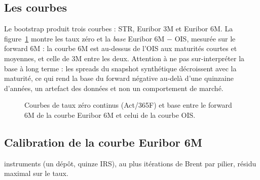 \documentclass[11pt,a4paper]{article}
\newcommand{\estr}{\texorpdfstring{\texteuro STR}{EUR STR}}
\theoremstyle{plain}
\theoremstyle{definition}
\theoremstyle{remark}
\begin{document}
\subsection{Les courbes}
Le bootstrap produit trois courbes : \estr{}, Euribor 3M et Euribor 6M. La
figure~\ref{fig:curves} montre les taux zéro et la \emph{base} Euribor 6M $-$ OIS, mesurée sur le
forward 6M : la courbe 6M est au-dessus de l'OIS aux maturités courtes et moyennes, et celle de 3M entre
les deux. Attention à ne pas sur-interpréter la base à long terme : les spreads du snapshot synthétique
décroissent avec la maturité, ce qui rend la base du forward négative au-delà d'une quinzaine d'années,
un artefact des données et non un comportement de marché.
\begin{figure}[H]
\centering
{}
\caption{Courbes de taux zéro continus (Act/365F) et base entre le forward 6M de la courbe Euribor 6M
et celui de la courbe OIS.}\label{fig:curves}
\end{figure}

\subsection{Calibration de la courbe Euribor 6M}
\IrsPillarCount{} instruments (un dépôt, quinze IRS), au plus \IrsMaxIterations{} itérations de
Brent par pilier, résidu maximal \IrsMaxResidual{} sur le taux.
\begin{table}[H]
\centering
\small

\caption{Nœuds calibrés de la courbe Euribor 6M.}
\end{table}
\end{document}
